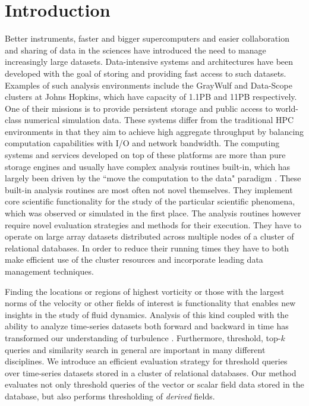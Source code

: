 \documentclass{sig-alternate}
\begin{document}
\section{Introduction}
Better instruments, faster and bigger supercomputers and easier collaboration and sharing of data in the sciences have introduced the need
to manage increasingly large datasets. Data-intensive systems and architectures have been developed with the goal of storing and providing
fast access to such datasets. Examples of such analysis environments include the GrayWulf and Data-Scope clusters \cite{Szalay, DataScope} at 
Johns Hopkins, which have capacity of 1.1PB and 11PB
respectively. One of their missions is to provide persistent storage and public access to world-class numerical simulation data. 
These systems differ from the traditional HPC environments in that they aim to achieve high aggregate throughput by balancing computation
capabilities with I/O and network bandwidth. The computing systems and services developed on top of these platforms are more than pure
storage engines and usually have complex analysis routines built-in, which has largely been driven by the ``move the computation to the data"
paradigm \cite{fourthparadigm}. These built-in analysis routines are most often not novel themselves. They implement core scientific functionality for the
study of the particular scientific phenomena, which was observed or simulated in the first place. The analysis routines however require novel evaluation
strategies and methods for their execution. They have to operate on large array datasets distributed across multiple nodes of a cluster of relational
databases. In order to reduce their running times they have to both make efficient use of the cluster resources and incorporate 
leading data management techniques.

Finding the locations or regions of highest vorticity or those with the largest norms of the velocity or other fields of interest is
functionality that enables new insights in the study of fluid dynamics. Analysis of this kind coupled with the ability to analyze time-series datasets both 
forward and backward in time has transformed our understanding of turbulence \cite{Eyink}. Furthermore, threshold, top-$k$ queries and similarity search
in general are important in many different disciplines. We introduce an efficient evaluation strategy for threshold
queries over time-series datasets stored in a cluster of relational databases. Our method evaluates not only threshold queries of the vector or 
scalar field data stored in the database, but also performs thresholding of \emph{derived} fields. 
\end{document}
